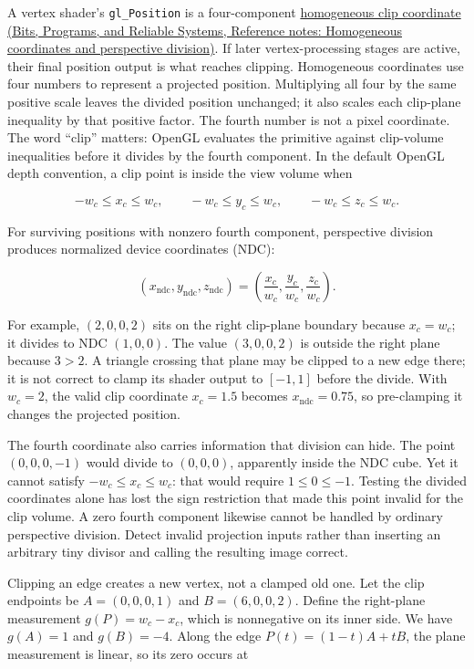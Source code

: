 A vertex shader's \texttt{gl\_Position} is a four-component \href{../01-Bits-Programs-and-Reliable-Systems/main.pdf\#nameddest=appendix-cb3b26862282}{homogeneous clip coordinate (Bits, Programs, and Reliable Systems, Reference notes: Homogeneous coordinates and perspective division)}. If later vertex-processing stages are active, their final position output is what reaches clipping. Homogeneous coordinates use four numbers to represent a projected position. Multiplying all four by the same positive scale leaves the divided position unchanged; it also scales each clip-plane inequality by that positive factor. The fourth number is not a pixel coordinate. The word ``clip'' matters: OpenGL evaluates the primitive against clip-volume inequalities before it divides by the fourth component. In the default OpenGL depth convention, a clip point is inside the view volume when

\[
-w_c\le x_c\le w_c,\qquad
-w_c\le y_c\le w_c,\qquad
-w_c\le z_c\le w_c.
\]

For surviving positions with nonzero fourth component, perspective division produces normalized device coordinates (NDC):

\[
(x_{\mathrm{ndc}},y_{\mathrm{ndc}},z_{\mathrm{ndc}})=
\left(\frac{x_c}{w_c},\frac{y_c}{w_c},\frac{z_c}{w_c}\right).
\]

For example, \((2,0,0,2)\) sits on the right clip-plane boundary because \(x_c=w_c\); it divides to NDC \((1,0,0)\). The value \((3,0,0,2)\) is outside the right plane because \(3>2\). A triangle crossing that plane may be clipped to a new edge there; it is not correct to clamp its shader output to \([-1,1]\) before the divide. With \(w_c=2\), the valid clip coordinate \(x_c=1.5\) becomes \(x_{\mathrm{ndc}}=0.75\), so pre-clamping it changes the projected position.

The fourth coordinate also carries information that division can hide. The point \((0,0,0,-1)\) would divide to \((0,0,0)\), apparently inside the NDC cube. Yet it cannot satisfy \(-w_c\leq x_c\leq w_c\): that would require \(1\leq0\leq-1\). Testing the divided coordinates alone has lost the sign restriction that made this point invalid for the clip volume. A zero fourth component likewise cannot be handled by ordinary perspective division. Detect invalid projection inputs rather than inserting an arbitrary tiny divisor and calling the resulting image correct.

Clipping an edge creates a new vertex, not a clamped old one. Let the clip endpoints be \(A=(0,0,0,1)\) and \(B=(6,0,0,2)\). Define the right-plane measurement \(g(P)=w_c-x_c\), which is nonnegative on its inner side. We have \(g(A)=1\) and \(g(B)=-4\). Along the edge \(P(t)=(1-t)A+tB\), the plane measurement is linear, so its zero occurs at

